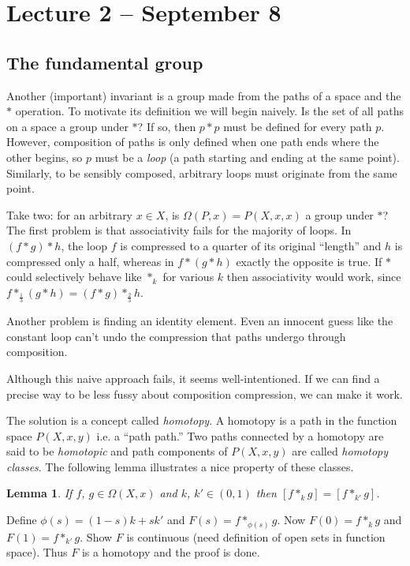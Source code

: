 \documentclass[letterpaper]{article}
\newtheorem{lemma}[theorem]{Lemma}
\newenvironment{proof}[1][Proof]{\begin{trivlist}
\item[\hskip \labelsep {\bfseries #1}]}{\end{trivlist}}
\begin{document}
\section{Lecture 2 -- September 8}

\subsection{The fundamental group}

Another (important) invariant is a group made from the paths of a
space and the $\ast$ operation. To motivate its definition we will
begin naively. Is the set of all paths on a space a group under
$\ast$? If so, then $p \ast p$ must be defined for every path $p$.
However, composition of paths is only defined when one path ends
where the other begins, so $p$ must be a \emph{loop} (a path starting
and ending at the same point). Similarly, to be sensibly composed,
arbitrary loops must originate from the same point.

Take two: for an arbitrary $x \in X$, is $\Omega(P, x) = P(X, x,
x)$ a group under $\ast$? The first problem is that associativity
fails for the majority of loops. In $(f \ast g) \ast h$, the loop
$f$ is compressed to a quarter of its original ``length'' and $h$
is compressed only a half, whereas in $f \ast (g \ast h)$ exactly
the opposite is true. If $\ast$ could selectively behave like
$\ast_k$ for various $k$ then associativity would work, since $f
\ast_\frac{1}{3} (g \ast h) = (f \ast g) \ast_\frac{2}{3} h$.

Another problem is finding an identity element. Even an innocent
guess like the constant loop can't undo the compression that paths
undergo through composition.

Although this naive approach fails, it seems well-intentioned. If
we can find a precise way to be less fussy about composition
compression, we can make it work.

The solution is a concept called \emph{homotopy}. A homotopy is a
path in the function space $P(X, x, y)$ i.e. a ``path path.'' Two
paths connected by a homotopy are said to be \emph{homotopic} and
path components of $P(X, x, y)$ are called \emph{homotopy classes}.
The following lemma illustrates a nice property of these classes.

\begin{lemma}
If $f$, $g \in \Omega(X, x)$ and $k$, $k' \in (0, 1)$ then $[f
\ast_k g] = [f \ast_{k'} g]$.
\end{lemma}
\begin{proof}
Define $\phi(s) = (1 - s)k + sk'$ and $F(s) = f \ast_{\phi(s)} g$.
Now $F(0) = f \ast_k g$ and $F(1) = f \ast_{k'} g$. Show $F$ is
continuous (need definition of open sets in function space). Thus
$F$ is a homotopy and the proof is done.
\end{proof}
\end{document}
